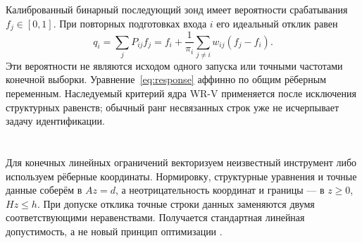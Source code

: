 {Калиброванный бинарный последующий зонд имеет вероятности срабатывания $f_j\in[0,1]$. При повторных подготовках входа $i$ его идеальный отклик равен}
\begin{equation}\label{eq:response}
 q_i=\sum_jP_{ij}f_j
 =f_i+\frac{1}{\pi_i}\sum_{j\ne i}w_{ij}(f_j-f_i).
\end{equation}
{Эти вероятности не являются исходом одного запуска или точными частотами конечной выборки. Уравнение~\eqref{eq:response} аффинно по общим рёберным переменным. Наследуемый критерий ядра WR-V применяется после исключения структурных равенств; обычный ранг несвязанных строк уже не исчерпывает задачу идентификации.}

\section{}
\label{sec:certificates}
{Для конечных линейных ограничений векторизуем неизвестный инструмент либо используем рёберные координаты. Нормировку, структурные уравнения и точные данные соберём в $Az=d$, а неотрицательность координат и границы --- в $z\geq0$, $Hz\leq h$. При допуске отклика точные строки данных заменяются двумя соответствующими неравенствами. Получается стандартная линейная допустимость, а не новый принцип оптимизации \cite[Sections 2.2.4, 4.3 and 5.8.3]{BV}.}

